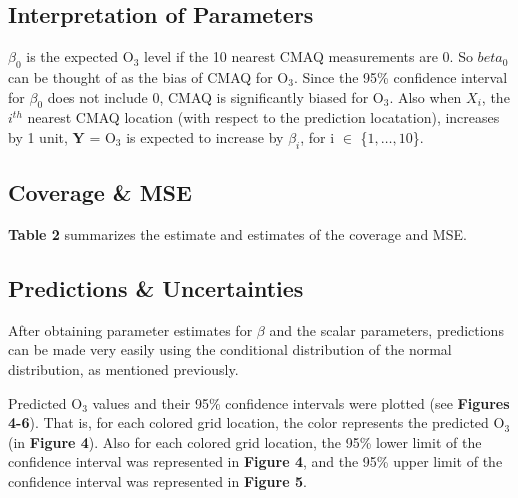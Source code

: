 \documentclass{article}                                                   %
\def\wl{\par \vspace{\baselineskip}}                                      %
\begin{document}
    

  \subsection{Interpretation of Parameters} 
    $\beta_0$ is the expected O$_3$ level if the 10 nearest CMAQ measurements
    are 0. So $beta_0$ can be thought of as the bias of CMAQ for O$_3$. Since
    the 95\% confidence interval for $\beta_0$ does not include 0, CMAQ is
    significantly biased for O$_3$.  Also when $X_i$, the $i^{th}$ nearest CMAQ
    location (with respect to the prediction locatation), increases by 1 unit,
    $\bm Y$ = O$_3$ is expected to increase by $\beta_i$, for i $\in$
    \{$1,\dots,10$\}.

  \subsection{Coverage \& MSE }
    \textbf{Table 2} summarizes the estimate and estimates of the coverage and MSE.
    

  \subsection{Predictions \& Uncertainties}
    After obtaining parameter estimates for $\beta$ and the scalar parameters,
    predictions can be made very easily using the conditional distribution
    of the normal distribution, as mentioned previously.
    \wl\noindent
    Predicted O$_3$ values and their 95\% confidence intervals were plotted
    (see \textbf{Figures 4-6}). That is, for each colored grid location, the color
    represents the predicted O$_3$ (in \textbf{Figure 4}). Also for each colored
    grid location, the 95\% lower limit of the confidence interval was represented
    in \textbf{Figure 4}, and the 95\% upper limit of the confidence interval
    was represented in \textbf{Figure 5}.
\end{document}
